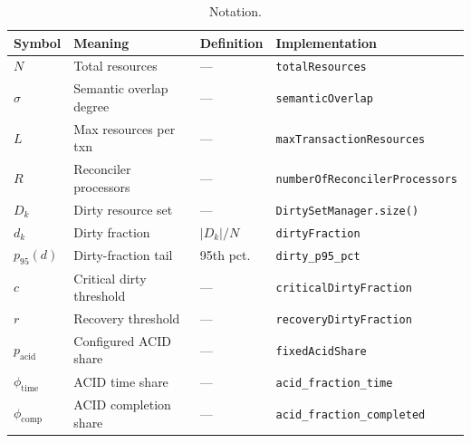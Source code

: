 \begin{table}[H]
  \centering
  \captionsetup{format=plain,justification=centering}
  \caption{Notation.}
  \label{tab:notation}
  \small
  \begingroup
  \renewcommand{\arraystretch}{1.3}
  \begin{tabular}{llll}
    \toprule
    Symbol                 & Meaning                  & Definition  & Implementation                        \\
    \midrule
    $N$                    & Total resources          & ---         & \texttt{totalResources}               \\
    $\sigma$               & Semantic overlap degree  & ---         & \texttt{semanticOverlap}              \\
    $L$                    & Max resources per txn    & ---         & \texttt{maxTransactionResources}      \\
    $R$                    & Reconciler processors    & ---         & \texttt{numberOfReconcilerProcessors} \\
    $D_k$                  & Dirty resource set       & ---         & \texttt{DirtySetManager.size()}       \\
    $d_k$                  & Dirty fraction           & $|D_k| / N$ & \texttt{dirtyFraction}                \\
    $p_{95}(d)$            & Dirty-fraction tail      & 95th pct.   & \texttt{dirty\_p95\_pct}              \\
    $c$                    & Critical dirty threshold & ---         & \texttt{criticalDirtyFraction}        \\
    $r$                    & Recovery threshold       & ---         & \texttt{recoveryDirtyFraction}        \\
    $p_{\mathrm{acid}}$    & Configured ACID share    & ---         & \texttt{fixedAcidShare}               \\
    $\phi_{\mathrm{time}}$ & ACID time share          & ---         & \texttt{acid\_fraction\_time}         \\
    $\phi_{\mathrm{comp}}$ & ACID completion share    & ---         & \texttt{acid\_fraction\_completed}    \\
    \bottomrule
  \end{tabular}
  \endgroup
\end{table}
